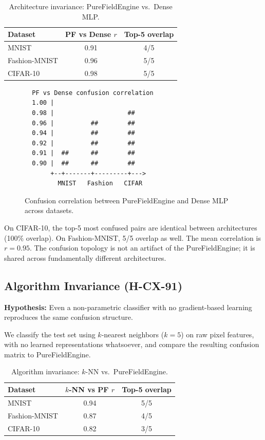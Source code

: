 \documentclass[11pt,a4paper]{article}
\begin{document}
\begin{table}[htbp]
\centering
\caption{Architecture invariance: PureFieldEngine vs.\ Dense MLP.}
\label{tab:arch-invariance}
\begin{tabular}{lcc}
\toprule
Dataset & PF vs Dense $r$ & Top-5 overlap \\
\midrule
MNIST         & 0.91 & 4/5 \\
Fashion-MNIST & 0.96 & 5/5 \\
CIFAR-10      & 0.98 & 5/5 \\
\bottomrule
\end{tabular}
\end{table}

\begin{figure}[htbp]
\centering
\begin{verbatim}
  PF vs Dense confusion correlation
  1.00 |
  0.98 |                    ##
  0.96 |          ##        ##
  0.94 |          ##        ##
  0.92 |          ##        ##
  0.91 |  ##      ##        ##
  0.90 |  ##      ##        ##
       +--+-------+---------+--->
         MNIST   Fashion   CIFAR
\end{verbatim}
\caption{Confusion correlation between PureFieldEngine and Dense MLP across datasets.}
\label{fig:arch-invariance}
\end{figure}

On CIFAR-10, the top-5 most confused pairs are identical between architectures (100\% overlap). On Fashion-MNIST, 5/5 overlap as well. The mean correlation is $r = 0.95$. The confusion topology is not an artifact of the PureFieldEngine; it is shared across fundamentally different architectures.

\subsection{Algorithm Invariance (H-CX-91)}

\textbf{Hypothesis:} Even a non-parametric classifier with no gradient-based learning reproduces the same confusion structure.

We classify the test set using $k$-nearest neighbors ($k = 5$) on raw pixel features, with no learned representations whatsoever, and compare the resulting confusion matrix to PureFieldEngine.

\begin{table}[htbp]
\centering
\caption{Algorithm invariance: $k$-NN vs.\ PureFieldEngine.}
\label{tab:algo-invariance}
\begin{tabular}{lcc}
\toprule
Dataset & $k$-NN vs PF $r$ & Top-5 overlap \\
\midrule
MNIST         & 0.94 & 5/5 \\
Fashion-MNIST & 0.87 & 4/5 \\
CIFAR-10      & 0.82 & 3/5 \\
\bottomrule
\end{tabular}
\end{table}
\end{document}
